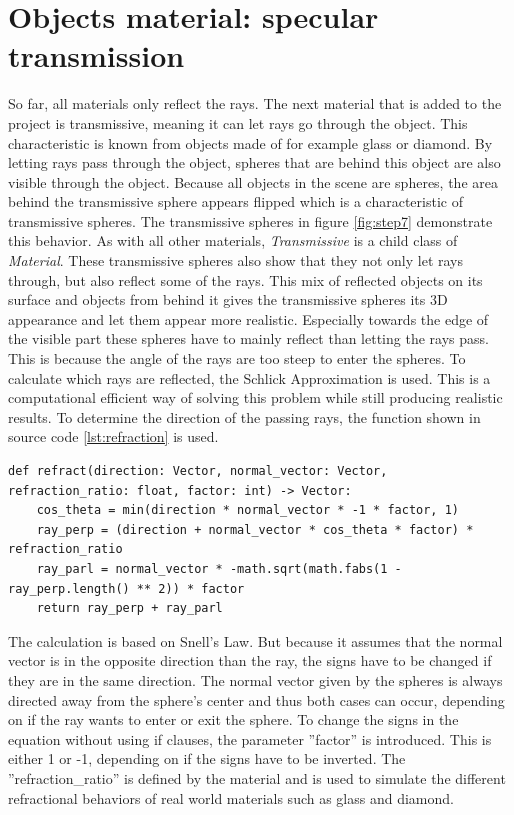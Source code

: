 \documentclass[12pt]{report}
\begin{document}
\chapter{Objects material: specular transmission}
\vspace*{-0.1cm}
So far, all materials only reflect the rays. The next material that is added to the project is transmissive, meaning it can let rays go through the object. This characteristic is known from objects made of for example glass or diamond. By letting rays pass through the object, spheres that are behind this object are also visible through the object. Because all objects in the scene are spheres, the area behind the transmissive sphere appears flipped which is a characteristic of transmissive spheres. The transmissive spheres in figure \ref{fig:step7} demonstrate this behavior. As with all other materials, \textit{Transmissive} is a child class of \textit{Material}. These transmissive spheres also show that they not only let rays through, but also reflect some of the rays. This mix of reflected objects on its surface and objects from behind it gives the transmissive spheres its 3D appearance and let them appear more realistic. Especially towards the edge of the visible part these spheres have to mainly reflect than letting the rays pass. This is because the angle of the rays are too steep to enter the spheres. To calculate which rays are reflected, the Schlick Approximation is used. This is a computational efficient way of solving this problem while still producing realistic results. To determine the direction of the passing rays, the function shown in source code \ref{lst:refraction} is used.
\begin{lstlisting}[caption={Calculating refracted ray}, label=lst:refraction, style=mystyle]
def refract(direction: Vector, normal_vector: Vector, refraction_ratio: float, factor: int) -> Vector:
    cos_theta = min(direction * normal_vector * -1 * factor, 1)
    ray_perp = (direction + normal_vector * cos_theta * factor) * refraction_ratio
    ray_parl = normal_vector * -math.sqrt(math.fabs(1 - ray_perp.length() ** 2)) * factor
    return ray_perp + ray_parl
\end{lstlisting}
The calculation is based on Snell's Law. But because it assumes that the normal vector is in the opposite direction than the ray, the signs have to be changed if they are in the same direction. The normal vector given by the spheres is always directed away from the sphere's center and thus both cases can occur, depending on if the ray wants to enter or exit the sphere. To change the signs in the equation without using if clauses, the parameter ''factor'' is introduced. This is either 1 or -1, depending on if the signs have to be inverted. The ''refraction\_ratio'' is defined by the material and is used to simulate the different refractional behaviors of real world materials such as glass and diamond.
\end{document}
